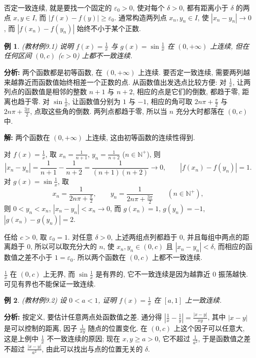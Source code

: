 \documentclass[UTF8,openany]{ctexbook}
\theoremstyle{chinesetextbook}
\newtheorem{example}{例}[section]
\newenvironment{cnsolution}{\par\indent\textbf{解:} \ignorespaces}{\par}
\begin{document}
否定一致连续, 就是要找一个固定的 $\varepsilon_0>0$, 使对每个 $\delta>0$, 都有距离小于 $\delta$ 的两点 $x,y\in I$, 而 $|f(x)-f(y)|\ge\varepsilon_0$. 通常构造两列点 $x_n,y_n\in I$, 使 $|x_n-y_n|\to0$, 而 $|f(x_n)-f(y_n)|$ 始终不小于某个正数.
\begin{example}\label{ex:9-1}
\textnormal{(教材例9.1)} 说明 $\displaystyle f(x)=\frac1x$ 与 $\displaystyle g(x)=\sin\frac1x$ 在 $(0,+\infty)$ 上连续, 但在任何区间 $(0,c)$ ($c>0$) 上都不一致连续.
\end{example}
\par\indent\textbf{分析:} 两个函数都是初等函数, 在 $(0,+\infty)$ 上连续. 要否定一致连续, 需要两列越来越靠近而函数值始终相差一个正数的点. 从函数值出发选点比较方便: 对 $\displaystyle\frac1x$, 让两列点的函数值是相邻的整数 $n+1$ 与 $n+2$, 相应的点是它们的倒数, 都趋于零, 距离也趋于零. 对 $\displaystyle\sin\frac1x$, 让函数值分别为 $1$ 与 $-1$, 相应的角可取 $\displaystyle2n\pi+\frac\pi2$ 与 $\displaystyle2n\pi+\frac{3\pi}2$, 点取这些角的倒数. 两列点都趋于零, 所以当 $n$ 充分大时都落在 $(0,c)$ 中.
\begin{cnsolution}
两个函数在 $(0,+\infty)$ 上连续, 这由初等函数的连续性得到.

对 $\displaystyle f(x)=\frac1x$, 取 $\displaystyle x_n=\frac1{n+1}$, $\displaystyle y_n=\frac1{n+2}$ ($n\in\mathbb N^+$), 则
\[
|x_n-y_n|=\frac1{n+1}-\frac1{n+2}=\frac1{(n+1)(n+2)}\to0,\qquad|f(x_n)-f(y_n)|=1.
\]
对 $\displaystyle g(x)=\sin\frac1x$, 取
\[
x_n=\frac1{2n\pi+\frac\pi2},\qquad y_n=\frac1{2n\pi+\frac{3\pi}2}\qquad(n\in\mathbb N^+),
\]
则 $0<y_n<x_n$, $|x_n-y_n|<x_n\to0$, 而 $g(x_n)=1$, $g(y_n)=-1$, $|g(x_n)-g(y_n)|=2$.

任给 $c>0$, 取 $\varepsilon_0=1$. 对任意 $\delta>0$, 上述两组点列都趋于 $0$, 并且每组中两点的距离趋于 $0$, 所以可以取充分大的 $n$, 使 $x_n,y_n\in(0,c)$ 且 $|x_n-y_n|<\delta$, 而相应的函数值之差不小于 $1=\varepsilon_0$. 所以两个函数在 $(0,c)$ 上都不一致连续.
\end{cnsolution}
$\displaystyle\frac1x$ 在 $(0,c)$ 上无界, 而 $\displaystyle\sin\frac1x$ 是有界的, 它不一致连续是因为越靠近 $0$ 振荡越快. 可见有界也不能保证一致连续.
\begin{example}
\textnormal{(教材例9.2)} 设 $0<a<1$, 证明 $\displaystyle f(x)=\frac1x$ 在 $[a,1]$ 上一致连续.
\end{example}
\par\indent\textbf{分析:} 按定义, 要估计任意两点处函数值之差. 通分得 $\displaystyle\left|\frac1x-\frac1y\right|=\frac{|x-y|}{xy}$, 其中 $|x-y|$ 是可以控制的距离, 因子 $\displaystyle\frac1{xy}$ 随点的位置变化. 在 $(0,c)$ 上这个因子可以任意大, 这是上例中 $\displaystyle\frac1x$ 不一致连续的原因; 现在 $x,y\ge a>0$, 它不超过 $\displaystyle\frac1{a^2}$, 于是函数值之差不超过 $\displaystyle\frac{|x-y|}{a^2}$, 由此可以找出与点的位置无关的 $\delta$.
\end{document}
